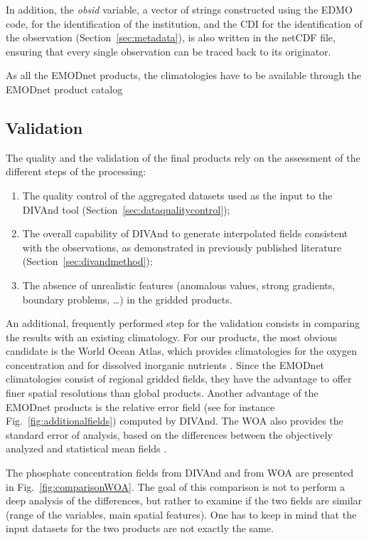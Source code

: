 \documentclass[essd, manuscript]{copernicus}
\begin{document}
In addition, the \textit{obsid} variable, a vector of strings constructed using the EDMO code, for the identification of the institution, and the CDI for the identification of the observation (Section~\ref{sec:metadata}), is also written in the netCDF file, ensuring that every single observation can be traced back to its originator.

As all the EMODnet products, the climatologies have to be available through the EMODnet product catalog \citep[][https://emodnet.ec.europa.eu/en]{BEJA2024}

\subsection{Validation}

The quality and the validation of the final products rely on the assessment of the different steps of the processing:
\begin{enumerate}
\item The quality control of the aggregated datasets used as the input to the DIVAnd tool (Section~\ref{sec:dataqualitycontrol});
\item The overall capability of DIVAnd to generate interpolated fields consistent with the observations, as demonstrated in previously published literature (Section~\ref{sec:divandmethod});
\item The absence of unrealistic features (anomalous values, strong gradients, boundary problems, \ldots) in the gridded products.
\end{enumerate}

An additional, frequently performed step for the validation consists in comparing the results with an existing climatology. For our products, the most obvious candidate is the World Ocean Atlas, which provides climatologies for the oxygen concentration \citep{Garcia2024} and for dissolved inorganic nutrients \citep{Garcia2024b}. Since the EMODnet climatologies consist of regional gridded fields, they have the advantage to offer finer spatial resolutions than global products. Another advantage of the EMODnet products is the relative error field (see for instance Fig.~\ref{fig:additionalfields}) computed by DIVAnd. The WOA also provides the standard error of analysis, based on the differences between the objectively analyzed and statistical mean fields \citep{Levitus2012}.

The phosphate concentration fields from DIVAnd and from WOA are presented in Fig.~\ref{fig:comparisonWOA}. The goal of this comparison is not to perform a deep analysis of the differences, but rather to examine if the two fields are similar (range of the variables, main spatial features). One has to keep in mind that the input datasets for the two products are not exactly the same. 
\end{document}
